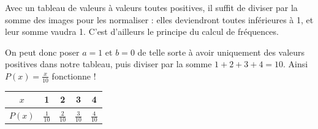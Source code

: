 {%
%	
%
	
	Avec un tableau de valeurs à valeurs toutes positives, il suffit de diviser par la somme des images pour les normaliser : elles deviendront toutes inférieures à 1, et leur somme vaudra 1.
	C'est d'ailleurs le principe du calcul de fréquences.
	
	On peut donc poser $a=1$ et $b=0$ de telle sorte à avoir uniquement des valeurs positives dans notre tableau, puis diviser par la somme $1+2+3+4 = 10$.
	Ainsi $P(x) = \frac{x}{10}$ fonctionne !
	\begin{center}
	\begin{tabular}{|c|c|c|c|c|} \hline
		$x$ & 1 & 2 & 3 & 4 \\ \hline
		$P(x)$ & $\frac{1}{10}$ & $\frac{2}{10}$ & $\frac{3}{10}$ & $\frac{4}{10}$ \\ \hline
	\end{tabular}
	\end{center}
	
}
